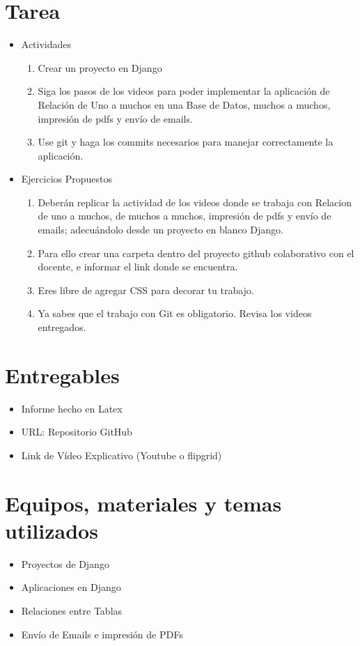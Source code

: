 \documentclass{article}
\begin{document}
	\section{Tarea}
    \begin{itemize}
      \item Actividades
        \begin{enumerate}
          \item Crear un proyecto en Django
          \item Siga los pasos de los videos para poder implementar la aplicación de Relación de Uno a muchos en una Base de Datos, muchos a muchos, impresión de pdfs y envío de emails.
          \item Use git y haga los commits necesarios para manejar correctamente la aplicación.
        \end{enumerate}
      \item Ejercicios Propuestos
        \begin{enumerate}
          \item Deberán replicar la actividad de los videos donde se trabaja con Relacion de uno a muchos, de muchos a muchos, impresión de pdfs y envío de emails;  adecuándolo desde un proyecto en blanco Django.
          \item Para ello crear una carpeta dentro del proyecto github colaborativo con el docente, e informar el link donde se encuentra.  
          \item Eres libre de agregar CSS para decorar tu trabajo.
          \item Ya sabes que el trabajo con Git es obligatorio.  Revisa los videos entregados.
        \end{enumerate}
    \end{itemize}
 
 
  \section{Entregables}
    \begin{itemize}
      \item Informe hecho en Latex
      \item URL: Repositorio GitHub
      \item Link de Vídeo Explicativo (Youtube o flipgrid)
    \end{itemize}
  
		
	\section{Equipos, materiales y temas utilizados}
    \begin{itemize}
      \item Proyectos de Django
      \item Aplicaciones en Django
      \item Relaciones entre Tablas
      \item Envío de Emails e impresión de PDFs
    \end{itemize}
\end{document}
